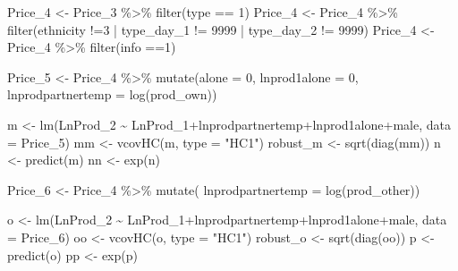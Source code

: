\documentclass[
]{article}
\newenvironment{Shaded}{\begin{snugshade}}{\end{snugshade}}
\newcommand{\AttributeTok}[1]{\textcolor[rgb]{0.77,0.63,0.00}{#1}}
\newcommand{\DecValTok}[1]{\textcolor[rgb]{0.00,0.00,0.81}{#1}}
\newcommand{\FunctionTok}[1]{\textcolor[rgb]{0.00,0.00,0.00}{#1}}
\newcommand{\NormalTok}[1]{#1}
\newcommand{\OtherTok}[1]{\textcolor[rgb]{0.56,0.35,0.01}{#1}}
\newcommand{\SpecialCharTok}[1]{\textcolor[rgb]{0.00,0.00,0.00}{#1}}
\newcommand{\StringTok}[1]{\textcolor[rgb]{0.31,0.60,0.02}{#1}}
\begin{document}
\begin{Shaded}
\begin{Highlighting}[]
\NormalTok{Price\_4 }\OtherTok{\textless{}{-}}\NormalTok{ Price\_3 }\SpecialCharTok{\%\textgreater{}\%} 
  \FunctionTok{filter}\NormalTok{(type }\SpecialCharTok{==} \DecValTok{1}\NormalTok{)}
\NormalTok{Price\_4 }\OtherTok{\textless{}{-}}\NormalTok{ Price\_4 }\SpecialCharTok{\%\textgreater{}\%}
  \FunctionTok{filter}\NormalTok{(ethnicity }\SpecialCharTok{!=}\DecValTok{3} \SpecialCharTok{|}\NormalTok{ type\_day\_1 }\SpecialCharTok{!=} \DecValTok{9999} \SpecialCharTok{|}\NormalTok{ type\_day\_2 }\SpecialCharTok{!=} \DecValTok{9999}\NormalTok{)}
\NormalTok{Price\_4 }\OtherTok{\textless{}{-}}\NormalTok{ Price\_4 }\SpecialCharTok{\%\textgreater{}\%}
  \FunctionTok{filter}\NormalTok{(info }\SpecialCharTok{==}\DecValTok{1}\NormalTok{)}

\NormalTok{Price\_5 }\OtherTok{\textless{}{-}}\NormalTok{ Price\_4 }\SpecialCharTok{\%\textgreater{}\%}
  \FunctionTok{mutate}\NormalTok{(}\AttributeTok{alone =} \DecValTok{0}\NormalTok{,}
         \AttributeTok{lnprod1alone =} \DecValTok{0}\NormalTok{,}
         \AttributeTok{lnprodpartnertemp =} \FunctionTok{log}\NormalTok{(prod\_own))}

\NormalTok{m }\OtherTok{\textless{}{-}} \FunctionTok{lm}\NormalTok{(LnProd\_2 }\SpecialCharTok{\textasciitilde{}}\NormalTok{ LnProd\_1}\SpecialCharTok{+}\NormalTok{lnprodpartnertemp}\SpecialCharTok{+}\NormalTok{lnprod1alone}\SpecialCharTok{+}\NormalTok{male, }\AttributeTok{data =}\NormalTok{ Price\_5)}
\NormalTok{mm }\OtherTok{\textless{}{-}} \FunctionTok{vcovHC}\NormalTok{(m, }\AttributeTok{type =} \StringTok{"HC1"}\NormalTok{)}
\NormalTok{robust\_m }\OtherTok{\textless{}{-}} \FunctionTok{sqrt}\NormalTok{(}\FunctionTok{diag}\NormalTok{(mm))}
\NormalTok{n }\OtherTok{\textless{}{-}} \FunctionTok{predict}\NormalTok{(m)}
\NormalTok{nn }\OtherTok{\textless{}{-}} \FunctionTok{exp}\NormalTok{(n)}

\NormalTok{Price\_6 }\OtherTok{\textless{}{-}}\NormalTok{ Price\_4 }\SpecialCharTok{\%\textgreater{}\%}
  \FunctionTok{mutate}\NormalTok{(}
         \AttributeTok{lnprodpartnertemp =} \FunctionTok{log}\NormalTok{(prod\_other))}

\NormalTok{o }\OtherTok{\textless{}{-}} \FunctionTok{lm}\NormalTok{(LnProd\_2 }\SpecialCharTok{\textasciitilde{}}\NormalTok{ LnProd\_1}\SpecialCharTok{+}\NormalTok{lnprodpartnertemp}\SpecialCharTok{+}\NormalTok{lnprod1alone}\SpecialCharTok{+}\NormalTok{male, }\AttributeTok{data =}\NormalTok{ Price\_6)}
\NormalTok{oo }\OtherTok{\textless{}{-}} \FunctionTok{vcovHC}\NormalTok{(o, }\AttributeTok{type =} \StringTok{"HC1"}\NormalTok{)}
\NormalTok{robust\_o }\OtherTok{\textless{}{-}} \FunctionTok{sqrt}\NormalTok{(}\FunctionTok{diag}\NormalTok{(oo))}
\NormalTok{p }\OtherTok{\textless{}{-}} \FunctionTok{predict}\NormalTok{(o)}
\NormalTok{pp }\OtherTok{\textless{}{-}} \FunctionTok{exp}\NormalTok{(p)}
\end{Highlighting}
\end{Shaded}
\end{document}
